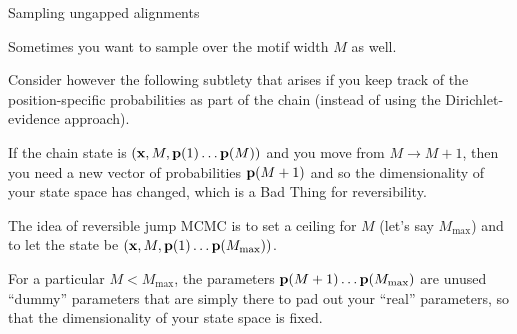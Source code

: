 \documentclass{beamer}
\begin{document}
\begin{frame}{Sampling ungapped alignments}

\itemb
 \item Sometimes you want to sample over the motif width $M$ as well.
  \itemb
  \item Consider however the following subtlety that arises if you keep track of the position-specific probabilities as part of the chain (instead of using the Dirichlet-evidence approach).
  \item If the chain state is $({\bf x},M,{\bf p}(1) \ldots {\bf p}(M))$ and you move from $M \to M+1$,
then you need a new vector of probabilities ${\bf p}(M+1)$ and so the dimensionality of your state space has changed, which is a Bad Thing for reversibility.
  \item The idea of \alert{reversible jump MCMC} is to set a ceiling for $M$ (let's say $M_{\max}$) and to let the state be $({\bf x},M,{\bf p}(1) \ldots {\bf p}(M_{\max}))$.
  \item For a particular $M < M_{\max}$, the parameters ${\bf p}(M+1) \ldots {\bf p}(M_{\max})$ are unused ``dummy'' parameters that are simply there to pad out your ``real'' parameters,
so that the dimensionality of your state space is fixed.
  \iteme
 \iteme

\end{frame}
\end{document}

